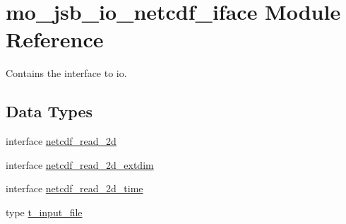 \hypertarget{namespacemo__jsb__io__netcdf__iface}{}\section{mo\+\_\+jsb\+\_\+io\+\_\+netcdf\+\_\+iface Module Reference}
\label{namespacemo__jsb__io__netcdf__iface}


Contains the interface to io.  


\subsection*{Data Types}
\begin{DoxyCompactItemize}
\item 
interface \hyperlink{interfacemo__jsb__io__netcdf__iface_1_1netcdf__read__2d}{netcdf\+\_\+read\+\_\+2d}
\item 
interface \hyperlink{interfacemo__jsb__io__netcdf__iface_1_1netcdf__read__2d__extdim}{netcdf\+\_\+read\+\_\+2d\+\_\+extdim}
\item 
interface \hyperlink{interfacemo__jsb__io__netcdf__iface_1_1netcdf__read__2d__time}{netcdf\+\_\+read\+\_\+2d\+\_\+time}
\item 
type \hyperlink{structmo__jsb__io__netcdf__iface_1_1t__input__file}{t\+\_\+input\+\_\+file}
\end{DoxyCompactItemize}
